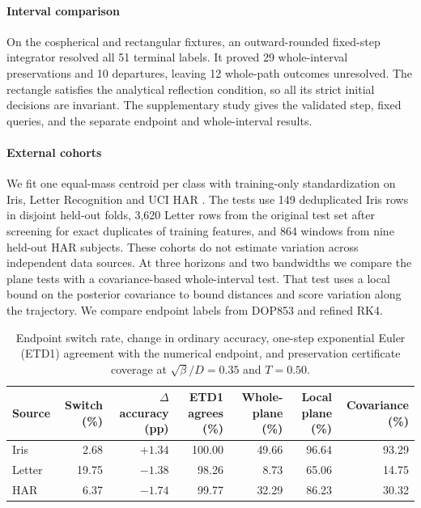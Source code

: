 \documentclass[final,5p,twocolumn]{elsarticle}
\begin{document}
\paragraph{Interval comparison}
On the cospherical and rectangular fixtures, an outward-rounded
fixed-step integrator resolved all 51 terminal labels. It proved
29 whole-interval preservations and 10 departures, leaving 12
whole-path outcomes unresolved. The rectangle satisfies the
analytical reflection condition, so all its strict initial
decisions are invariant. The supplementary study gives the
validated step, fixed queries, and the separate endpoint and
whole-interval results.

\paragraph{External cohorts}
We fit one equal-mass centroid per class with training-only
standardization on Iris, Letter Recognition and UCI HAR
\cite{iris,letter,har}. The tests use 149 deduplicated Iris rows
in disjoint held-out folds, 3,620 Letter rows from the original
test set after screening for exact duplicates of training features,
and 864 windows from nine held-out HAR subjects. These cohorts
do not estimate variation across independent data sources.
At three horizons and two bandwidths we compare the plane
tests with a covariance-based whole-interval test. That test uses
a local bound on the posterior covariance to bound distances
and score variation along the trajectory. We compare endpoint
labels from DOP853 and refined RK4.

\begin{table}[t]
\centering
\small
\setlength{\tabcolsep}{3.5pt}
\begin{tabular}{lrrrrrr}
\toprule
Source & Switch (\%) & $\Delta$ accuracy (pp) & ETD1 agrees (\%)
       & Whole-plane (\%) & Local plane (\%) & Covariance (\%)\\
\midrule
Iris & 2.68 & $+1.34$ & 100.00 & 49.66 & 96.64 & 93.29\\
Letter & 19.75 & $-1.38$ & 98.26 & 8.73 & 65.06 & 14.75\\
HAR & 6.37 & $-1.74$ & 99.77 & 32.29 & 86.23 & 30.32\\
\bottomrule
\end{tabular}
\caption{Endpoint switch rate, change in ordinary accuracy, one-step
exponential Euler (ETD1) agreement with the numerical endpoint, and
preservation certificate coverage at $\sqrt{\beta}/D=0.35$ and $T=0.50$.}
\label{tab:letter}
\end{table}
\end{document}
